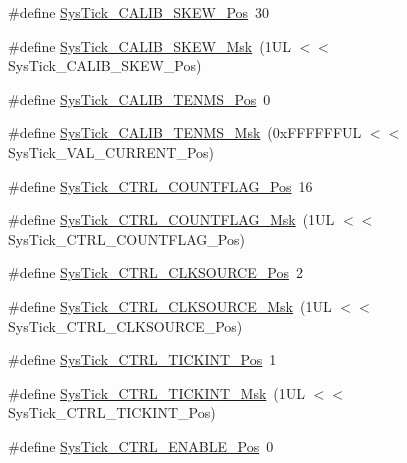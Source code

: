 \begin{DoxyCompactItemize}
\item 
\#define \mbox{\hyperlink{group___c_m_s_i_s___sys_tick_gadd0c9cd6641b9f6a0c618e7982954860}{Sys\+Tick\+\_\+\+C\+A\+L\+I\+B\+\_\+\+S\+K\+E\+W\+\_\+\+Pos}}~30
\item 
\#define \mbox{\hyperlink{group___c_m_s_i_s___sys_tick_ga8a6a85a87334776f33d77fd147587431}{Sys\+Tick\+\_\+\+C\+A\+L\+I\+B\+\_\+\+S\+K\+E\+W\+\_\+\+Msk}}~(1\+U\+L $<$$<$ Sys\+Tick\+\_\+\+C\+A\+L\+I\+B\+\_\+\+S\+K\+E\+W\+\_\+\+Pos)
\item 
\#define \mbox{\hyperlink{group___c_m_s_i_s___sys_tick_gacae558f6e75a0bed5d826f606d8e695e}{Sys\+Tick\+\_\+\+C\+A\+L\+I\+B\+\_\+\+T\+E\+N\+M\+S\+\_\+\+Pos}}~0
\item 
\#define \mbox{\hyperlink{group___c_m_s_i_s___sys_tick_gaf1e68865c5aece2ad58971225bd3e95e}{Sys\+Tick\+\_\+\+C\+A\+L\+I\+B\+\_\+\+T\+E\+N\+M\+S\+\_\+\+Msk}}~(0x\+F\+F\+F\+F\+F\+F\+U\+L $<$$<$ Sys\+Tick\+\_\+\+V\+A\+L\+\_\+\+C\+U\+R\+R\+E\+N\+T\+\_\+\+Pos)
\item 
\#define \mbox{\hyperlink{group___c_m_s_i_s___sys_tick_gadbb65d4a815759649db41df216ed4d60}{Sys\+Tick\+\_\+\+C\+T\+R\+L\+\_\+\+C\+O\+U\+N\+T\+F\+L\+A\+G\+\_\+\+Pos}}~16
\item 
\#define \mbox{\hyperlink{group___c_m_s_i_s___sys_tick_ga1bf3033ecccf200f59baefe15dbb367c}{Sys\+Tick\+\_\+\+C\+T\+R\+L\+\_\+\+C\+O\+U\+N\+T\+F\+L\+A\+G\+\_\+\+Msk}}~(1\+U\+L $<$$<$ Sys\+Tick\+\_\+\+C\+T\+R\+L\+\_\+\+C\+O\+U\+N\+T\+F\+L\+A\+G\+\_\+\+Pos)
\item 
\#define \mbox{\hyperlink{group___c_m_s_i_s___sys_tick_ga24fbc69a5f0b78d67fda2300257baff1}{Sys\+Tick\+\_\+\+C\+T\+R\+L\+\_\+\+C\+L\+K\+S\+O\+U\+R\+C\+E\+\_\+\+Pos}}~2
\item 
\#define \mbox{\hyperlink{group___c_m_s_i_s___sys_tick_gaa41d06039797423a46596bd313d57373}{Sys\+Tick\+\_\+\+C\+T\+R\+L\+\_\+\+C\+L\+K\+S\+O\+U\+R\+C\+E\+\_\+\+Msk}}~(1\+U\+L $<$$<$ Sys\+Tick\+\_\+\+C\+T\+R\+L\+\_\+\+C\+L\+K\+S\+O\+U\+R\+C\+E\+\_\+\+Pos)
\item 
\#define \mbox{\hyperlink{group___c_m_s_i_s___sys_tick_ga88f45bbb89ce8df3cd2b2613c7b48214}{Sys\+Tick\+\_\+\+C\+T\+R\+L\+\_\+\+T\+I\+C\+K\+I\+N\+T\+\_\+\+Pos}}~1
\item 
\#define \mbox{\hyperlink{group___c_m_s_i_s___sys_tick_ga95bb984266ca764024836a870238a027}{Sys\+Tick\+\_\+\+C\+T\+R\+L\+\_\+\+T\+I\+C\+K\+I\+N\+T\+\_\+\+Msk}}~(1\+U\+L $<$$<$ Sys\+Tick\+\_\+\+C\+T\+R\+L\+\_\+\+T\+I\+C\+K\+I\+N\+T\+\_\+\+Pos)
\item 
\#define \mbox{\hyperlink{group___c_m_s_i_s___sys_tick_ga0b48cc1e36d92a92e4bf632890314810}{Sys\+Tick\+\_\+\+C\+T\+R\+L\+\_\+\+E\+N\+A\+B\+L\+E\+\_\+\+Pos}}~0
$$
\end{DoxyCompactItemize}
